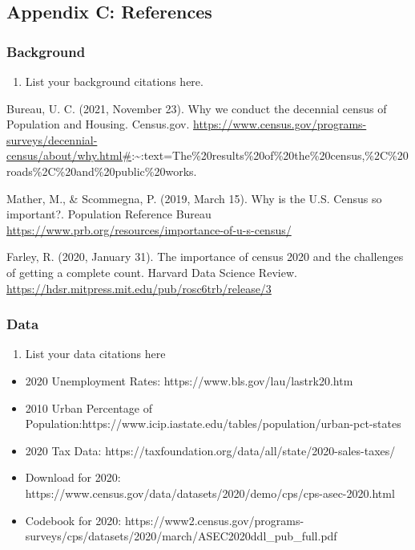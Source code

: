 \documentclass[
  12pt,
]{article}
\providecommand{\tightlist}{%
  \setlength{\itemsep}{0pt}\setlength{\parskip}{0pt}}
\begin{document}
\newpage

\hypertarget{appendix-c-references}{%
\subsection{Appendix C: References}\label{appendix-c-references}}

\hypertarget{background-1}{%
\subsubsection{Background}\label{background-1}}

\begin{enumerate}
\def\labelenumi{\arabic{enumi}.}
\tightlist
\item
  List your background citations here.
\end{enumerate}

Bureau, U. C. (2021, November 23). Why we conduct the decennial census
of Population and Housing. Census.gov.
\url{https://www.census.gov/programs-surveys/decennial-census/about/why.html\#}:\textasciitilde:text=The\%20results\%20of\%20the\%20census,\%2C\%20roads\%2C\%20and\%20public\%20works.

Mather, M., \& Scommegna, P. (2019, March 15). Why is the U.S. Census so
important?. Population Reference Bureau
\url{https://www.prb.org/resources/importance-of-u-s-census/}

Farley, R. (2020, January 31). The importance of census 2020 and the
challenges of getting a complete count. Harvard Data Science Review.
\url{https://hdsr.mitpress.mit.edu/pub/rosc6trb/release/3}

\hypertarget{data}{%
\subsubsection{Data}\label{data}}

\begin{enumerate}
\def\labelenumi{\arabic{enumi}.}
\tightlist
\item
  List your data citations here
\end{enumerate}

\begin{itemize}
  \item 2020 Unemployment Rates: https://www.bls.gov/lau/lastrk20.htm
  \item 2010 Urban Percentage of Population:https://www.icip.iastate.edu/tables/population/urban-pct-states
  \item 2020 Tax Data: https://taxfoundation.org/data/all/state/2020-sales-taxes/
  \item Download for 2020: https://www.census.gov/data/datasets/2020/demo/cps/cps-asec-2020.html
  \item Codebook for 2020: https://www2.census.gov/programs-surveys/cps/datasets/2020/march/ASEC2020ddl_pub_full.pdf 
\end{itemize}
\end{document}
